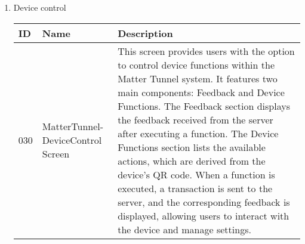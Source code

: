 \documentclass[conference]{IEEEtran}
\begin{document}
\begin{enumerate}[itemsep=2ex, parsep=1ex]
\begin{enumerate}[itemsep=2ex, parsep=1ex]
	      	\item Device control
	      	      \begin{table}[h!]
	      	      	\def\arraystretch{1.24} \small
	      	      	\begin{tabular}{|p{1.2cm}|p{2.5cm}|p{4.0cm}|}
	      	      		\hline
	      	      		ID  & Name                              & Description                                                                                                                                                                                                                                                                                                                                                                                                                                                                                                                                                   \\
	      	      		\hline
	      	      		030 & MatterTunnel-DeviceControl Screen & This screen provides users with the option to control device functions within the Matter Tunnel system. It features two main components: Feedback and Device Functions. The Feedback section displays the feedback received from the server after executing a function. The Device Functions section lists the available actions, which are derived from the device's QR code. When a function is executed, a transaction is sent to the server, and the corresponding feedback is displayed, allowing users to interact with the device and manage settings. \\
	      	      		\hline
	      	      	\end{tabular}
	      	      \end{table}
	      	      

\end{enumerate}
\end{enumerate}
\end{document}
